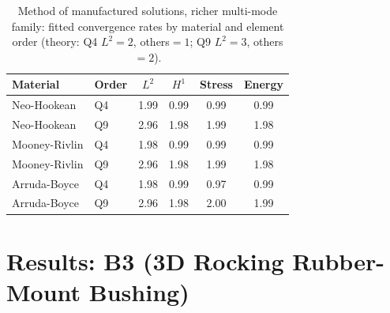 \documentclass[final,5p,times]{elsarticle}
\begin{document}
\begin{table}[h]
\centering
\caption{Method of manufactured solutions, richer multi-mode family:
  fitted convergence rates by material and element order (theory: Q4
  $L^2{=}2$, others${=}1$; Q9 $L^2{=}3$, others${=}2$).}
\label{tab:mms-rates}
\small
\begin{tabular}{llcccc}
\toprule
Material & Order & $L^2$ & $H^1$ & Stress & Energy \\
\midrule
Neo-Hookean    & Q4 & 1.99 & 0.99 & 0.99 & 0.99 \\
Neo-Hookean    & Q9 & 2.96 & 1.98 & 1.99 & 1.98 \\
Mooney-Rivlin  & Q4 & 1.98 & 0.99 & 0.99 & 0.99 \\
Mooney-Rivlin  & Q9 & 2.96 & 1.98 & 1.99 & 1.98 \\
Arruda-Boyce   & Q4 & 1.98 & 0.99 & 0.97 & 0.99 \\
Arruda-Boyce   & Q9 & 2.96 & 1.98 & 2.00 & 1.99 \\
\bottomrule
\end{tabular}
\end{table}

\section{Results: B3 (3D Rocking Rubber-Mount Bushing)}
\label{sec:results-3d}
\end{document}
